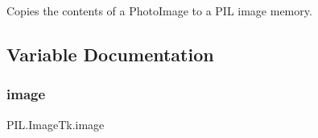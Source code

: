 \begin{DoxyVerb}Copies the contents of a PhotoImage to a PIL image memory.\end{DoxyVerb}
 

\subsection{Variable Documentation}
\mbox{\label{namespacePIL_1_1ImageTk_aa639552cd8cb63f42e281f4f5358ed5f}} 
\subsubsection{\texorpdfstring{image}{image}}
{\footnotesize\ttfamily P\+I\+L.\+Image\+Tk.\+image}

